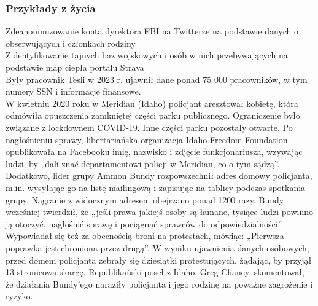 \subsubsection{Przykłady z życia}
Zdeanonimizowanie konta dyrektora FBI na Twitterze na podstawie danych o obserwujących i członkach rodziny\\
Zidentyfikowanie tajnych baz wojskowych i osób w nich przebywających na podstawie map ciepła portalu Strava\\
Były pracownik Tesli w 2023 r. ujawnił dane ponad 75 000 pracowników, w tym numery SSN i informacje finansowe.\\

W kwietniu 2020 roku w Meridian (Idaho) policjant aresztował kobietę, która odmówiła opuszczenia zamkniętej części parku publicznego. Ograniczenie było związane z lockdownem COVID-19. Inne części parku pozostały otwarte.
Po nagłośnieniu sprawy, libertariańska organizacja Idaho Freedom Foundation opublikowała na Facebooku imię, nazwisko i zdjęcie funkcjonariusza, wzywając ludzi, by „dali znać departamentowi policji w Meridian, co o tym sądzą”.
Dodatkowo, lider grupy Ammon Bundy rozpowszechnił adres domowy policjanta, m.in. wysyłając go na listę mailingową i zapisując na tablicy podczas spotkania grupy. Nagranie z widocznym adresem obejrzano ponad 1200 razy.
Bundy wcześniej twierdził, że „jeśli prawa jakiejś osoby są łamane, tysiące ludzi powinno ją otoczyć, nagłośnić sprawę i pociągnąć sprawców do odpowiedzialności”. Wypowiadał się też za obecnością broni na protestach, mówiąc: „Pierwsza poprawka jest chroniona przez drugą”.
W wyniku ujawnienia danych osobowych, przed domem policjanta zebrały się dziesiątki protestujących, żądając, by przyjął 13-stronicową skargę.
Republikański poseł z Idaho, Greg Chaney, skomentował, że działania Bundy'ego naraziły policjanta i jego rodzinę na poważne zagrożenie i ryzyko.

